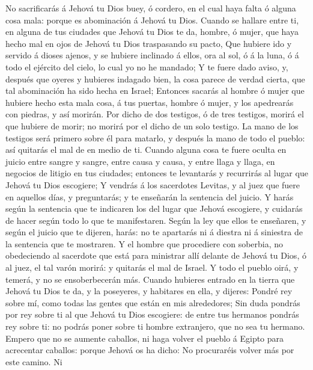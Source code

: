  No sacrificarás á Jehová tu Dios buey, ó cordero, en el
cual haya falta ó alguna cosa mala: porque es abominación á Jehová tu
Dios.  Cuando se hallare entre ti, en alguna de tus ciudades
que Jehová tu Dios te da, hombre, ó mujer, que haya hecho mal en ojos de
Jehová tu Dios traspasando su pacto,  Que hubiere ido y
servido á dioses ajenos, y se hubiere inclinado á ellos, ora al sol, ó á
la luna, ó á todo el ejército del cielo, lo cual yo no he mandado;
 Y te fuere dado aviso, y, después que oyeres y hubieres
indagado bien, la cosa parece de verdad cierta, que tal abominación ha
sido hecha en Israel;  Entonces sacarás al hombre ó mujer
que hubiere hecho esta mala cosa, á tus puertas, hombre ó mujer, y los
apedrearás con piedras, y así morirán.  Por dicho de dos
testigos, ó de tres testigos, morirá el que hubiere de morir; no morirá
por el dicho de un solo testigo.  La mano de los testigos
será primero sobre él para matarlo, y después la mano de todo el pueblo:
así quitarás el mal de en medio de ti.  Cuando alguna cosa
te fuere oculta en juicio entre sangre y sangre, entre causa y causa, y
entre llaga y llaga, en negocios de litigio en tus ciudades; entonces te
levantarás y recurrirás al lugar que Jehová tu Dios escogiere;
 Y vendrás á los sacerdotes Levitas, y al juez que fuere en
aquellos días, y preguntarás; y te enseñarán la sentencia del juicio.
 Y harás según la sentencia que te indicaren los del lugar
que Jehová escogiere, y cuidarás de hacer según todo lo que te
manifestaren.  Según la ley que ellos te enseñaren, y según
el juicio que te dijeren, harás: no te apartarás ni á diestra ni á
siniestra de la sentencia que te mostraren.  Y el hombre
que procediere con soberbia, no obedeciendo al sacerdote que está para
ministrar allí delante de Jehová tu Dios, ó al juez, el tal varón
morirá: y quitarás el mal de Israel.  Y todo el pueblo
oirá, y temerá, y no se ensoberbecerán más.  Cuando
hubieres entrado en la tierra que Jehová tu Dios te da, y la poseyeres,
y habitares en ella, y dijeres: Pondré rey sobre mí, como todas las
gentes que están en mis alrededores;  Sin duda pondrás por
rey sobre ti al que Jehová tu Dios escogiere: de entre tus hermanos
pondrás rey sobre ti: no podrás poner sobre ti hombre extranjero, que no
sea tu hermano.  Empero que no se aumente caballos, ni haga
volver el pueblo á Egipto para acrecentar caballos: porque Jehová os ha
dicho: No procuraréis volver más por este camino.  Ni
